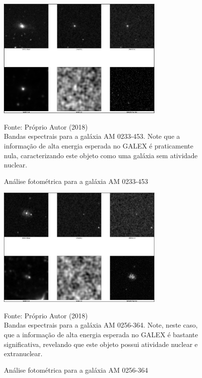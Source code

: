 \begin{figure}[H]
	\centering	
    \caption{Análise fotométrica para a galáxia AM 0233-453}
    \includegraphics[width=0.73\textwidth]{figuras/ima23.jpg}
    \begin{center}
        \normalsize Fonte: Próprio Autor (2018)\\Bandas espectrais para a galáxia AM 0233-453. Note que a informação de alta energia esperada no GALEX é praticamente nula, caracterizando este objeto como uma galáxia sem atividade nuclear.
    \end{center}
	\label{fig:sbmt-moses}
\end{figure}

\begin{figure}[H]
	\centering	
    \caption{Análise fotométrica para a galáxia AM 0256-364}
    \includegraphics[width=0.73\textwidth]{figuras/ima24.jpg}
   	\begin{center}
        \normalsize Fonte: Próprio Autor (2018)\\Bandas espectrais para a galáxia AM 0256-364. Note, neste caso, que a informação de alta energia esperada no GALEX é bastante significativa, revelando que este objeto possui atividade nuclear e extranuclear.
    \end{center}
	\label{fig:sbmt-moses}
\end{figure}

